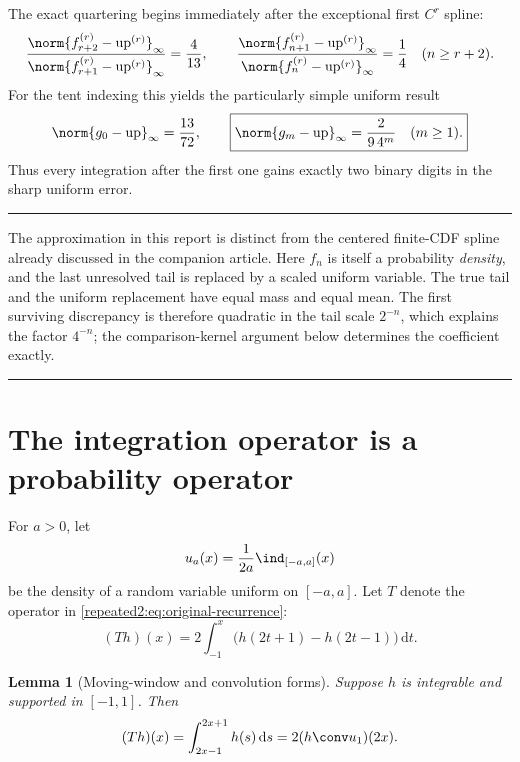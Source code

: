 \documentclass[11pt,oneside]{article}
\newtheorem{lemma}[theorem]{Lemma}
\theoremstyle{definition}
\theoremstyle{remark}
\newcommand{\Up}{\operatorname{up}}
\newcommand{\dd}{\,\mathrm d}
\newenvironment{boxedremark}{%
  \par\smallskip\noindent\begin{center}\begin{minipage}{0.94\textwidth}%
  \color{black}\hrule\vspace{0.6em}\small
}{%
  \vspace{0.6em}\hrule\end{minipage}\end{center}\smallskip
}
\begin{document}
The exact quartering begins immediately after the exceptional first $C^r$ spline:
\begin{equation}
 \frac{\norm{f_{r+2}^{(r)}-\Up^{(r)}}_\infty}
 {\norm{f_{r+1}^{(r)}-\Up^{(r)}}_\infty}=\frac4{13},
 \qquad
 \frac{\norm{f_{n+1}^{(r)}-\Up^{(r)}}_\infty}
 {\norm{f_n^{(r)}-\Up^{(r)}}_\infty}=\frac14
 \quad(n\ge r+2).
 \label{repeated2:eq:exact-error-ratios}
\end{equation}
For the tent indexing this yields the particularly simple uniform result
\begin{equation}
 \norm{g_0-\Up}_\infty=\frac{13}{72},
 \qquad
 \boxed{\displaystyle
 \norm{g_m-\Up}_\infty=\frac{2}{9\,4^m}\quad(m\ge1).}
 \label{repeated2:eq:tent-uniform-rate}
\end{equation}
Thus every integration after the first one gains exactly two binary digits in the sharp
uniform error.

\begin{boxedremark}
The approximation in this report is distinct from the centered finite-CDF spline already
discussed in the companion article.  Here $f_n$ is itself a probability \emph{density}, and
the last unresolved tail is replaced by a scaled uniform variable.  The true tail and the
uniform replacement have equal mass and equal mean.  The first surviving discrepancy is
therefore quadratic in the tail scale $2^{-n}$, which explains the factor $4^{-n}$; the
comparison-kernel argument below determines the coefficient exactly.
\end{boxedremark}

\section{The integration operator is a probability operator}
\label{repeated2:sec:probability-operator}

For $a>0$, let
\begin{equation}
 u_a(x)=\frac1{2a}\ind_{[-a,a]}(x)
 \label{repeated2:eq:uniform-density}
\end{equation}
be the density of a random variable uniform on $[-a,a]$.  Let $T$ denote the operator in
\eqref{repeated2:eq:original-recurrence}:
\begin{equation}
 (Th)(x)=2\int_{-1}^{x}\bigl(h(2t+1)-h(2t-1)\bigr)\dd t.
 \label{repeated2:eq:T-definition}
\end{equation}

\begin{lemma}[Moving-window and convolution forms]
\label{repeated2:lem:T-convolution}
Suppose $h$ is integrable and supported in $[-1,1]$.  Then
\begin{equation}
 (Th)(x)=\int_{2x-1}^{2x+1}h(s)\dd s
 =2(h\conv u_1)(2x).
 \label{repeated2:eq:T-moving-window}
\end{equation}
\end{lemma}
\end{document}
